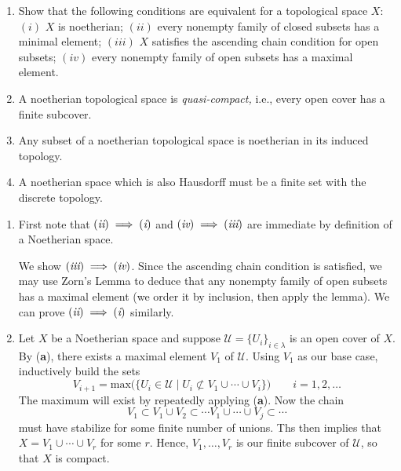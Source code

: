 \documentclass{/Users/SHER/Documents/Hartshorne-Exercises/hw_pset} %
\begin{document}
\begin{exercise}[1.7]
    \begin{enumerate}
        \item Show that the following conditions are equivalent for a topological
        space $X$: $(i)$ $X$ is noetherian; $(ii)$ every nonempty family of
        closed subsets has a minimal element; $(iii)$ $X$ satisfies the ascending
        chain condition for open subsets; $(iv)$ every nonempty family of open
        subsets has a maximal element.
      \item A noetherian topological space is \emph{quasi-compact,} i.e., every
        open cover has a finite subcover.
      \item Any subset of a noetherian topological space is noetherian in its
        induced topology.
      \item A noetherian space which is also Hausdorff must be a finite set with
        the discrete topology.    
    \end{enumerate}
\end{exercise}

\begin{solution}
    \begin{enumerate}
        \item First note that $(\emph{ii}) \implies (\emph{i})$ and $(\emph{iv}) \implies (\emph{iii})$ 
        are immediate by definition of a Noetherian space.
        
        We show $(\emph{iii}) \implies (\emph{iv})$. Since the ascending chain condition is satisfied, 
        we may use Zorn's Lemma to deduce that any nonempty family of open subsets has 
        a maximal element (we order it by inclusion, then apply the lemma).
        We can prove $(\emph{ii}) \implies (\emph{i})$ similarly.
    
        \item Let $X$ be a Noetherian space and suppose $\mathcal{U} = \{U_{i}\}_{i \in \lambda}$ 
        is an open cover of $X$. 
        By (\textbf{a}), there exists a maximal element $V_1$ of $\mathcal{U}$. Using 
        $V_1$ as our base case, inductively build the sets 
        \[
            V_{i+1} = \text{max}\bigg(\bigg\{ U_i \in \mathcal{U} \;\bigg|\; U_i \not\subset V_1 \cup \cdots \cup V_{i}  \bigg\}\bigg) \qquad i = 1, 2, \dots
        \]
        The maximum will exist by repeatedly applying (\textbf{a}). Now the chain 
        \[
            V_1 \subset V_1 \cup V_2 \subset \cdots V_1 \cup \cdots \cup V_j \subset \cdots
        \]
        must have stabilize for some finite number of unions. Ths then implies that 
        $X = V_1 \cup \cdots \cup V_r$ for some $r$. Hence, $V_1, \dots, V_r$ is our finite 
        subcover of $\mathcal{U}$, so that $X$ is compact.

    \end{enumerate}
\end{solution}
\end{document}
